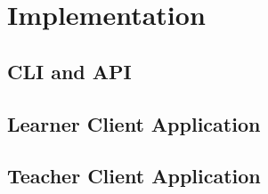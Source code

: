 \chapter{Implementation}

\section{CLI and API}

\section{Learner Client Application}

\section{Teacher Client Application}